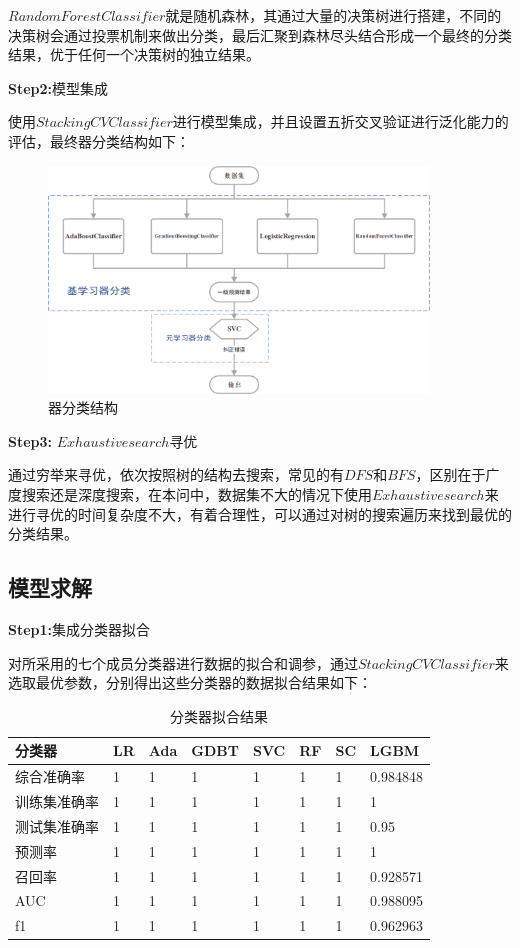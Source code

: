 \documentclass[UTF8]{ctexart}
\begin{document}
 $RandomForestClassifier$就是随机森林，其通过大量的决策树进行搭建，不同的决策树会通过投票机制来做出分类，最后汇聚到森林尽头结合形成一个最终的分类结果，优于任何一个决策树的独立结果。

\textbf{Step2:}模型集成

使用$StackingCVClassifier$进行模型集成，并且设置五折交叉验证进行泛化能力的评估，最终器分类结构如下：

\begin{figure}[H]\centering
	\includegraphics[width=0.9\textwidth]{img/器分类结构.png} %
	\caption{器分类结构} %
	\label{fig:figure 9} %
\end{figure}

\textbf{Step3:} $Exhaustive search$寻优

通过穷举来寻优，依次按照树的结构去搜索，常见的有$DFS$和$BFS$，区别在于广度搜索还是深度搜索，在本问中，数据集不大的情况下使用$Exhaustive search$来进行寻优的时间复杂度不大，有着合理性，可以通过对树的搜索遍历来找到最优的分类结果。


\subsection{模型求解}

\textbf{Step1:}集成分类器拟合

对所采用的七个成员分类器进行数据的拟合和调参，通过$StackingCVClassifier$来选取最优参数，分别得出这些分类器的数据拟合结果如下：

\begin{table}[H]
    \centering
	\caption{分类器拟合结果}
    \begin{tabular}{|l|l|l|l|l|l|l|l|}
    \hline
        分类器 & LR & Ada & GDBT & SVC & RF & SC & LGBM \\ \hline
         综合准确率 & 1 & 1 & 1 & 1 & 1 & 1 & 0.984848 \\ \hline
        训练集准确率 & 1 & 1 & 1 & 1 & 1 & 1 & 1 \\ \hline
        测试集准确率 & 1 & 1 & 1 & 1 & 1 & 1 & 0.95 \\ \hline
        预测率 & 1 & 1 & 1 & 1 & 1 & 1 & 1 \\ \hline
        召回率 & 1 & 1 & 1 & 1 & 1 & 1 & 0.928571 \\ \hline
        AUC & 1 & 1 & 1 & 1 & 1 & 1 & 0.988095 \\ \hline
        f1 & 1 & 1 & 1 & 1 & 1 & 1 & 0.962963 \\ \hline
    \end{tabular}
\end{table}
\end{document}
